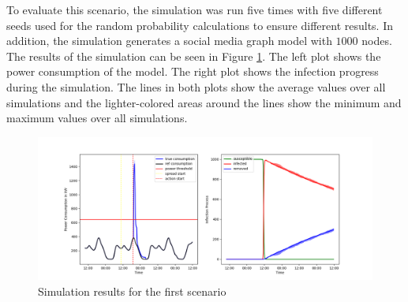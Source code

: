 To evaluate this scenario, the simulation was run five times with five 
different seeds used for the random probability calculations to ensure
different results. In addition, the simulation generates a social media
graph model with $1000$ nodes. The results of the simulation 
can be seen in Figure \ref{firstscenariobasicresult}.
The left plot shows the power consumption of the model. The right 
plot shows the infection progress during the simulation.
The lines in both plots show the average values over all simulations and 
the lighter-colored areas around the lines show the minimum and maximum values
over all simulations. 


\begin{figure}[!ht]
    \center
    \includegraphics[scale=.53]{figs/eval/scenario1/basic_run.png}
    \caption{Simulation results for the first scenario}
    \label{firstscenariobasicresult}
\end{figure}

